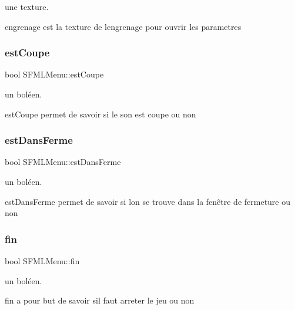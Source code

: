 une texture. 

engrenage est la texture de l\textquotesingle{}engrenage pour ouvrir les parametres \mbox{\label{class_s_f_m_l_menu_a2ae2e3fe14e1c2589026d8ad86229328}} 
\subsubsection{\texorpdfstring{est\+Coupe}{estCoupe}}
{\footnotesize\ttfamily bool S\+F\+M\+L\+Menu\+::est\+Coupe\hspace{0.3cm}{\ttfamily [private]}}



un boléen. 

est\+Coupe permet de savoir si le son est coupe ou non \mbox{\label{class_s_f_m_l_menu_ab20d9203dca5e9bcd0c006e51c14f0b2}} 
\subsubsection{\texorpdfstring{est\+Dans\+Ferme}{estDansFerme}}
{\footnotesize\ttfamily bool S\+F\+M\+L\+Menu\+::est\+Dans\+Ferme\hspace{0.3cm}{\ttfamily [private]}}



un boléen. 

est\+Dans\+Ferme permet de savoir si l\textquotesingle{}on se trouve dans la fenêtre de fermeture ou non \mbox{\label{class_s_f_m_l_menu_aab0fff32068b15d9b7e2a9ba598aa5eb}} 
\subsubsection{\texorpdfstring{fin}{fin}}
{\footnotesize\ttfamily bool S\+F\+M\+L\+Menu\+::fin\hspace{0.3cm}{\ttfamily [private]}}



un boléen. 

fin a pour but de savoir s\textquotesingle{}il faut arreter le jeu ou non \mbox{\label{class_s_f_m_l_menu_a276079d83760b4e11b5f7e1a6c2685e3}} 
